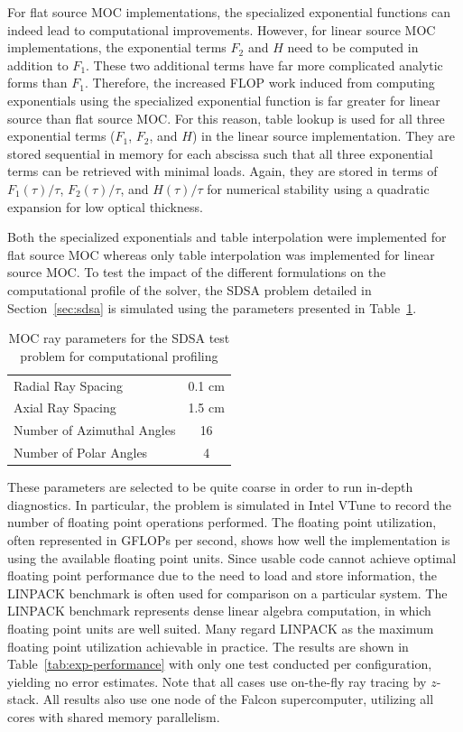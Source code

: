 For flat source \ac{MOC} implementations, the specialized exponential functions can indeed lead to computational improvements. However, for linear source \ac{MOC} implementations, the exponential terms $F_2$ and $H$ need to be computed in addition to $F_1$. These two additional terms have far more complicated analytic forms than $F_1$. Therefore, the increased \ac{FLOP} work induced from computing exponentials using the specialized exponential function is far greater for linear source than flat source \ac{MOC}. For this reason, table lookup is used for all three exponential terms ($F_1$, $F_2$, and $H$) in the linear source implementation. They are stored sequential in memory for each abscissa such that all three exponential terms can be retrieved with minimal loads. Again, they are stored in terms of $F_1(\tau) / \tau$, $F_2(\tau) / \tau$, and $H(\tau) / \tau$ for numerical stability using a quadratic expansion for low optical thickness. 

Both the specialized exponentials and table interpolation were implemented for flat source \ac{MOC} whereas only table interpolation was implemented for linear source \ac{MOC}. To test the impact of the different formulations on the computational profile of the solver, the SDSA problem detailed in Section~\ref{sec:sdsa} is simulated using the parameters presented in Table~\ref{tab:exp-performance-params}. 

\begin{table}[ht]
	\centering
	\caption{MOC ray parameters for the SDSA test problem for computational profiling}
	\medskip
	\begin{tabular}{lc}
		\hline
		Radial Ray Spacing & 0.1 cm \\
		Axial Ray Spacing & 1.5 cm \\
		Number of Azimuthal Angles & 16 \\
		Number of Polar Angles & 4 \\
		\hline
	\end{tabular}
	\label{tab:exp-performance-params}
\end{table}

These parameters are selected to be quite coarse in order to run in-depth diagnostics. In particular, the problem is simulated in Intel VTune to record the number of floating point operations performed. The floating point utilization, often represented in G\acp{FLOP} per second, shows how well the implementation is using the available floating point units. Since usable code cannot achieve optimal floating point performance due to the need to load and store information, the LINPACK benchmark is often used for comparison on a particular system. The LINPACK benchmark represents dense linear algebra computation, in which floating point units are well suited. Many regard LINPACK as the maximum floating point utilization achievable in practice. The results are shown in Table~\ref{tab:exp-performance} with only one test conducted per configuration, yielding no error estimates. Note that all cases use on-the-fly ray tracing by $z$-stack. All results also use one node of the Falcon supercomputer, utilizing all cores with shared memory parallelism.

